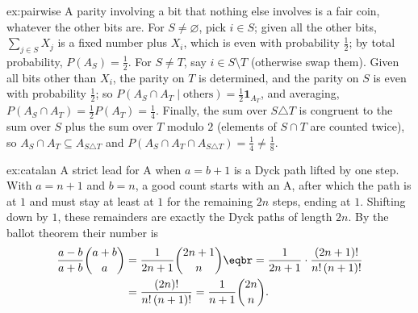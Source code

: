 \begin{solution}{ex:pairwise}
\idea A parity involving a bit that nothing else involves is a fair coin, whatever the other bits are.
\writeup For $S\ne\varnothing$, pick $i\in S$; given all the other bits, $\sum_{j\in S}X_j$ is a fixed number plus
$X_i$, which is even with probability $\frac12$; by total probability, $P(A_S)=\frac12$. For $S\ne T$, say
$i\in S\setminus T$ (otherwise swap them). Given all bits other than $X_i$, the parity on $T$ is determined, and
the parity on $S$ is even with probability $\frac12$; so $P(A_S\cap A_T\mid\text{others})=\frac12\mathbf
1_{A_T}$, and averaging, $P(A_S\cap A_T)=\frac12P(A_T)=\frac14$. Finally, the sum over $S\triangle T$ is congruent
to the sum over $S$ plus the sum over $T$ modulo $2$ (elements of $S\cap T$ are counted twice), so $A_S\cap A_T\subseteq
A_{S\triangle T}$ and $P(A_S\cap A_T\cap A_{S\triangle T})=\frac14\ne\frac18$.
\end{solution}

\begin{solution}{ex:catalan}
\idea A strict lead for A when $a=b+1$ is a Dyck path lifted by one step.
\writeup With $a=n+1$ and $b=n$, a good count starts with an A, after which the path is at $1$ and must stay at
least at $1$ for the remaining $2n$ steps, ending at $1$. Shifting down by $1$, these remainders are exactly the
Dyck paths of length $2n$. By the ballot theorem their number is
\[
\begin{aligned}\frac{a-b}{a+b}\binom{a+b}a&=\frac1{2n+1}\binom{2n+1}{n}\eqbr=\frac1{2n+1}\cdot\frac{(2n+1)!}{n!\,(n+1)!}\\&=\frac{(2n)!}{n!\,(n+1)!}=\frac1{n+1}\binom{2n}n.\end{aligned}
\]
\end{solution}

